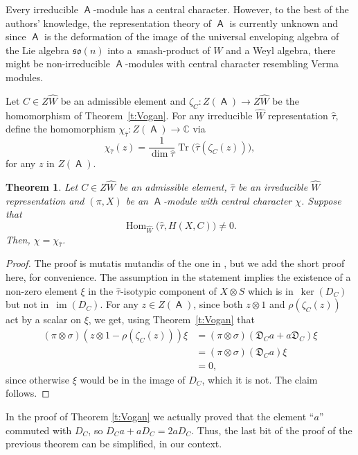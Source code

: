 \documentclass[10pt,a4paper]{amsart}
\numberwithin{equation}{section}
\newtheorem{Theorem}{Theorem}[section]
\DeclareMathOperator{\im}{im}
\DeclareMathOperator{\Hom}{Hom}
\DeclareMathOperator{\Tr}{Tr}
\newcommand{\fo}{\mathfrak{o}}
\newcommand{\fs}{\mathfrak{s}}
\newcommand{\bbc}{\mathbb{C}}
\DeclareMathOperator{\ama}{\mathsf{A}}
\begin{document}
\begin{Remark}
Every irreducible $\ama$-module has a central character. However, to the best of the authors' knowledge, the representation theory of $\ama$ is currently unknown and since $\ama$ is the deformation of the image of the universal enveloping algebra of the Lie algebra $\fs\fo(n)$ into a~smash-product of $W$ and a Weyl algebra, there might be non-irreducible $\ama$-modules with central character resembling Verma modules.
\end{Remark}

\begin{Definition}
Let $C\in Z\hat{W}$ be an admissible element and $\zeta_C\colon Z(\ama)\to Z\hat{W}$ be the homomorphism of Theorem~\ref{t:Vogan}. For any irreducible $\hat{W}$ representation $\hat{\tau}$, define the homomorphism $\chi_{\hat{\tau}}\colon Z(\ama)\to\bbc$ via
\[
\chi_{\hat{\tau}}(z) = \frac{1}{\dim\hat{\tau}}\Tr\big( \hat{\tau}(\zeta_C(z)) \big),
\]
for any $z$ in $Z(\ama)$.
\end{Definition}


\begin{Theorem}\label{t:CentChar}
Let $C\in Z\hat{W}$ be an admissible element, $\hat\tau$ be an irreducible $\hat{W}$ representation and $(\pi,X)$ be an $\ama$-module with central character $\chi$. Suppose that
\[
\Hom_{\hat{W}}\big(\hat{\tau},H(X,C)\big)\neq 0.
\]
Then, $\chi = \chi_{\hat{\tau}}$.
\end{Theorem}


\begin{proof}
The proof is mutatis mutandis of the one in \cite[Theorem~4.5]{BCT12}, but we add the short proof here, for convenience. The assumption in the statement implies the existence of a non-zero element $\xi$ in the $\hat{\tau}$-isotypic component of $X\otimes S$ which is in~$\ker(D_C)$ but not in~$\im(D_C)$. For any $z\in Z(\ama)$, since both $z\otimes 1$ and $\rho(\zeta_C(z))$ act by a scalar on $\xi$, we get, using Theorem~\ref{t:Vogan} that
\begin{align*}
 (\pi\otimes \sigma)(z\otimes 1 - \rho(\zeta_C(z)))\xi & = (\pi\otimes \sigma)(\mathfrak{D}_Ca + a\mathfrak{D}_C)\xi\\
 &= (\pi\otimes \sigma)(\mathfrak{D}_Ca)\xi\\
 &= 0,
\end{align*}
since otherwise $\xi$ would be in the image of $D_C$, which it is not. The claim follows.
\end{proof}

\begin{Remark}
In the proof of Theorem \ref{t:Vogan} we actually proved that the element ``$a$'' commuted with $D_C$, so $D_Ca + aD_C = 2aD_C$. Thus, the last bit of the proof of the previous theorem can be simplified, in our context.
\end{Remark}
\end{document}
